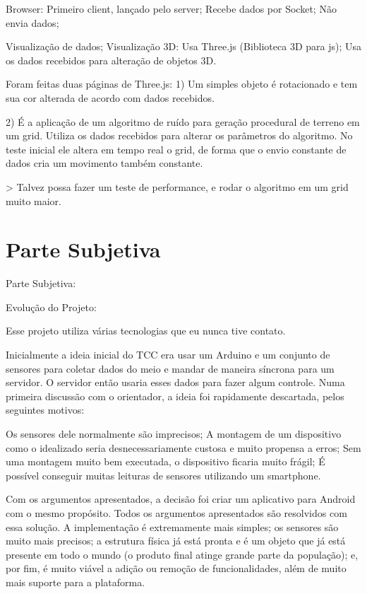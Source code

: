 \documentclass[a4paper,12pt]{article}
\begin{document}
Browser:
  Primeiro client, lançado pelo server;
  Recebe dados por Socket;
  Não envia dados;


  Visualização de dados;
    Visualização 3D:
      Usa Three.js (Biblioteca 3D para js);
      Usa os dados recebidos para alteração de objetos 3D.


      Foram feitas duas páginas de Three.js:
        1) Um simples objeto é rotacionado e tem sua cor alterada de acordo com dados recebidos.


        2) É a aplicação de um algoritmo de ruído para geração procedural de terreno em um grid. Utiliza os dados recebidos para alterar os parâmetros do algoritmo.
          No teste inicial ele altera em tempo real o grid, de forma que o envio constante de dados cria um movimento também constante.


          > Talvez possa fazer um teste de performance, e rodar o algoritmo em um grid muito maior.







\section{Parte Subjetiva}

Parte Subjetiva:




Evolução do Projeto:


Esse projeto utiliza várias tecnologias que eu nunca tive contato.


Inicialmente a ideia inicial do TCC era usar um Arduino e um conjunto de sensores para coletar dados do meio e mandar de maneira síncrona para um servidor. O servidor então usaria esses dados para fazer algum controle. Numa primeira discussão com o orientador, a ideia foi rapidamente descartada, pelos seguintes motivos:

Os sensores dele normalmente são imprecisos;
A montagem de um dispositivo como o idealizado seria desnecessariamente custosa e muito propensa a erros;
Sem uma montagem muito bem executada, o dispositivo ficaria muito frágil;
É possível conseguir muitas leituras de sensores utilizando um smartphone.


  Com os argumentos apresentados, a decisão foi criar um aplicativo para Android com o mesmo propósito. Todos os argumentos apresentados são resolvidos com essa solução. A implementação é extremamente mais simples; os sensores são muito mais precisos; a estrutura física já está pronta e é um objeto que já está presente em todo o mundo (o produto final atinge grande parte da população); e, por fim, é muito viável a adição ou remoção de funcionalidades, além de muito mais suporte para a plataforma.
\end{document}
